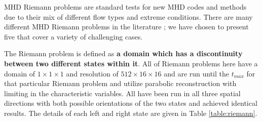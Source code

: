 \documentclass[modern, linenumbers]{aastex631}
\begin{document}
MHD Riemann problems are standard tests for new MHD codes and methods due to their mix of different flow types and extreme conditions. There are many different MHD Riemann problems in the literature \citep{brio_wu_1988, einfeldt_1991, ryu_jones_1995, dai_woodward_1998}; we have chosen to present five that cover a variety of challenging cases.

The Riemann problem is defined as \textbf{a domain which has a discontinuity between two different states within it}. All of Riemann problems here have a domain of $1\times1\times1$ and resolution of $512\times16\times16$ and are run until the $t_{max}$ for that particular Riemann problem and utilize parabolic reconstruction with limiting in the characteristic variables. All have been run in all three spatial directions with both possible orientations of the two states and achieved identical results. The details of each left and right state are given in Table \ref{table:riemann}.

\end{document}
